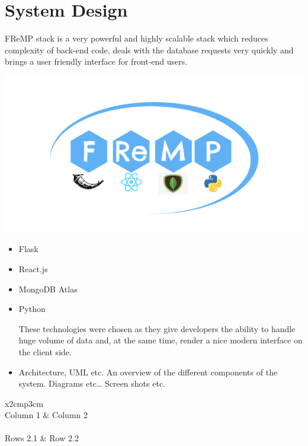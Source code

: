\chapter{System Design}
FReMP stack is a very powerful and highly scalable stack which reduces complexity of back-end code, deals with the database requests very quickly and brings a user friendly interface for front-end users.

\begin{center}    
      \includegraphics{img/fremp.PNG}
\end{center}

\begin{itemize}
\item Flask
\item React.js
\item MongoDB Atlas
\item Python

These technologies were chosen as they give developers the ability to handle huge volume of data and, at the same time, render a nice modern interface on the client side. 
\item Architecture, UML etc. An overview of the different components of the system. Diagrams etc… Screen shots etc.
\end{itemize}

\begin{table}[h]
  \centering
  \begin{tabular}{x{2cm}p{3cm}}
    \toprule \\
    Column 1 & Column 2 \\
    \midrule \\
    Rows 2.1 & Row 2.2 \\
    \bottomrule
  \end{tabular}
  \caption{A table.}
  \label{table:mytable}
\end{table}

